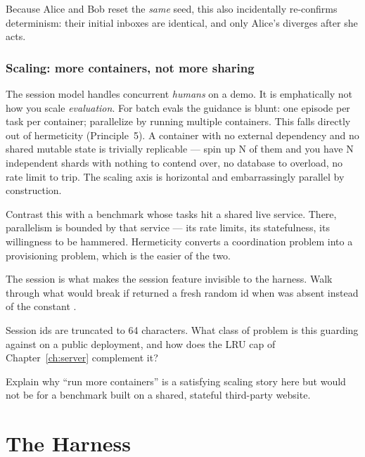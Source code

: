 \documentclass[11pt,openany]{book}
\newcommand{\code}[1]{\textcolor{clayd}{\texttt{\detokenize{#1}}}}
\newcommand{\exhead}{\vspace{0.8em}\needspace{3\baselineskip}%
  \noindent{\large\bfseries\color{clayd}Exercises}\par\nobreak\vspace{0.3em}}
\begin{document}
Because Alice and Bob reset the \emph{same} seed, this also incidentally
re-confirms determinism: their initial inboxes are identical, and only Alice's
diverges after she acts.

\section{Scaling: more containers, not more sharing}

The session model handles concurrent \emph{humans} on a demo. It is emphatically
not how you scale \emph{evaluation}. For batch evals the guidance is blunt: one
episode per task per container; parallelize by running multiple containers. This
falls directly out of hermeticity (Principle~5). A container with no external
dependency and no shared mutable state is trivially replicable — spin up N of
them and you have N independent shards with nothing to contend over, no database
to overload, no rate limit to trip. The scaling axis is horizontal and
embarrassingly parallel by construction.

\begin{notebox}[.\ ]
Contrast this with a benchmark whose tasks hit a shared live service. There,
parallelism is bounded by that service — its rate limits, its statefulness, its
willingness to be hammered. Hermeticity converts a coordination problem into a
provisioning problem, which is the easier of the two.
\end{notebox}

\exhead
\begin{exercises}
\item The \code{default} session is what makes the session feature invisible to
the harness. Walk through what would break if \code{_sid} returned a fresh random
id when \code{sid} was absent instead of the constant \code{"default"}.
\item Session ids are truncated to 64 characters. What class of problem is this
guarding against on a public deployment, and how does the LRU cap of
Chapter~\ref{ch:server} complement it?
\item Explain why ``run more containers'' is a satisfying scaling story here but
would not be for a benchmark built on a shared, stateful third-party website.
\end{exercises}

\part{The Harness}
\end{document}
